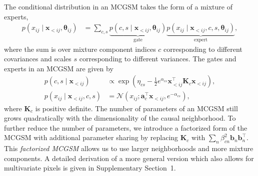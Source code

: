 \documentclass{article}
\begin{document}
		The conditional distribution in an MCGSM takes the form of a mixture of experts,\begin{align}
			p(x_{ij} \mid \mathbf{x}_{<ij}, \bm{\theta}_{ij})
			&= \sum_{c,s} \underbrace{p(c, s \mid \mathbf{x}_{<ij}, \bm{\theta}_{ij})}_\text{gate} \underbrace{p(x_{ij} \mid \mathbf{x}_{<ij}, c, s, \bm{\theta}_{ij})}_\text{expert},
		\end{align}
		where the sum is over mixture component indices $c$ corresponding to different covariances
		and scales $s$ corresponding to different variances.
		The gates and experts in an MCGSM are given by
		\begin{align}
			p(c, s \mid \mathbf{x}_{<ij})
			&\propto \textstyle \exp\left( \eta_{cs} - \frac{1}{2} e^{\alpha_{cs}} \mathbf{x}_{<ij}^\top \mathbf{K}_c \mathbf{x}_{<ij} \right),
			\label{eq:gates} \\
			p(x_{ij} \mid \mathbf{x}_{<ij}, c, s)
			&= \mathcal{N}(x_{ij}; \mathbf{a}_c^\top \mathbf{x}_{<ij}, e^{-\alpha_{cs}}),
			\label{eq:experts}
		\end{align}
		where $\mathbf{K}_c$ is positive definite. The number of parameters of an MCGSM still grows quadratically with
		the dimensionality of the causal neighborhood. To further reduce the number of parameters,
		we introduce a factorized form of the MCGSM with additional parameter sharing by replacing
		$\mathbf{K}_c$ with $\sum_n \beta_{cn}^2 \mathbf{b}_n\mathbf{b}_n^\top$.
		This \textit{factorized MCGSM} allows us to use larger neighborhoods and more mixture components.
		A detailed derivation of a more general version which also allows for multivariate pixels is given in
		Supplementary Section~1.
\end{document}
